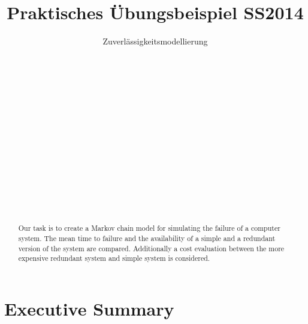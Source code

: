 \documentclass[
            a4paper
            ]{scrartcl}%
\title{Praktisches Übungsbeispiel SS2014}
\subtitle{Zuverlässigkeitsmodellierung}
\author{
 \authorname{Markus Kessler} \\
 \studentnumber{1225380} \\
 \curriculum{033 535}\\
 \email{e1225380@student.tuwien.ac.at}\\\\
 \authorname{Mathias Lechner} \\
 \studentnumber{1225134} \\
 \curriculum{033 535}\\
 \email{e1225134@student.tuwien.ac.at}\\\\
 \authorname{Martin Wührer} \\
 \studentnumber{1225177} \\
 \curriculum{033 535}\\
 \email{e1225177@student.tuwien.ac.at}
}
\begin{document}
\renewcommand*{\Frefeqname}{Gleichung}
\renewcommand*{\Freffigname}{Abbildung}

\maketitle

\begin{abstract}
Our task is to create a Markov chain model for simulating the failure of a computer system. The mean time to failure and the availability of a simple and a redundant version of the system are compared. Additionally a cost evaluation between the more expensive redundant system and simple system is considered.
\end{abstract}

\section{Executive Summary}

\newpage
\end{document}
